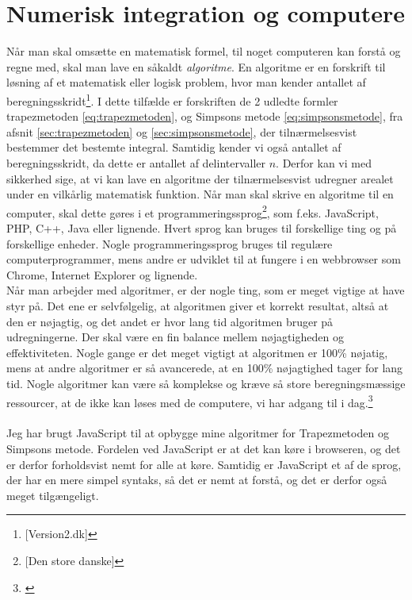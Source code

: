 \documentclass[12pt]{article}
\numberwithin{equation}{section}
\begin{document}
\pagebreak
\section{Numerisk integration og computere}
Når man skal omsætte en matematisk formel, til noget computeren kan forstå og regne med, skal man lave en såkaldt \emph{algoritme}. En algoritme er en forskrift til løsning af et matematisk eller logisk problem, hvor man kender antallet af beregningsskridt\footnote{\cite{version2:algoritme}[Version2.dk]}. I dette tilfælde er forskriften de 2 udledte formler trapezmetoden \eqref{eq:trapezmetoden}, og Simpsons metode \eqref{eq:simpsonsmetode}, fra afsnit \ref{sec:trapezmetoden} og \ref{sec:simpsonsmetode}, der tilnærmelsesvist bestemmer det bestemte integral. Samtidig kender vi også antallet af beregningsskridt, da dette er antallet af delintervaller $n$. Derfor kan vi med sikkerhed sige, at vi kan lave en algoritme der tilnærmelsesvist udregner arealet under en vilkårlig matematisk funktion.
Når man skal skrive en algoritme til en computer, skal dette gøres i et programmeringssprog\footnote{\cite{denstoredanske:algoritme}[Den store danske]}, som f.eks. JavaScript, PHP, C++, Java eller lignende. Hvert sprog kan bruges til forskellige ting og på forskellige enheder. Nogle programmeringssprog bruges til regulære computerprogrammer, mens andre er udviklet til at fungere i en webbrowser som Chrome, Internet Explorer og lignende.
\\
Når man arbejder med algoritmer, er der nogle ting, som er meget vigtige at have styr på. Det ene er selvfølgelig, at algoritmen giver et korrekt resultat, altså at den er nøjagtig, og det andet er hvor lang tid algoritmen bruger på udregningerne. Der skal være en fin balance mellem nøjagtigheden og effektiviteten. Nogle gange er det meget vigtigt at algoritmen er 100\% nøjatig, mens at andre algoritmer er så avancerede, at en 100\% nøjagtighed tager for lang tid. Nogle algoritmer kan være så komplekse og kræve så store beregningsmæssige ressourcer, at de ikke kan løses med de computere, vi har adgang til i dag.\footnote{\cite{version2:algoritme}}
\\\\
Jeg har brugt JavaScript til at opbygge mine algoritmer for Trapezmetoden og Simpsons metode. Fordelen ved JavaScript er at det kan køre i browseren, og det er derfor forholdsvist nemt for alle at køre. Samtidig er JavaScript et af de sprog, der har en mere simpel syntaks, så det er nemt at forstå, og det er derfor også meget tilgængeligt.
\end{document}
